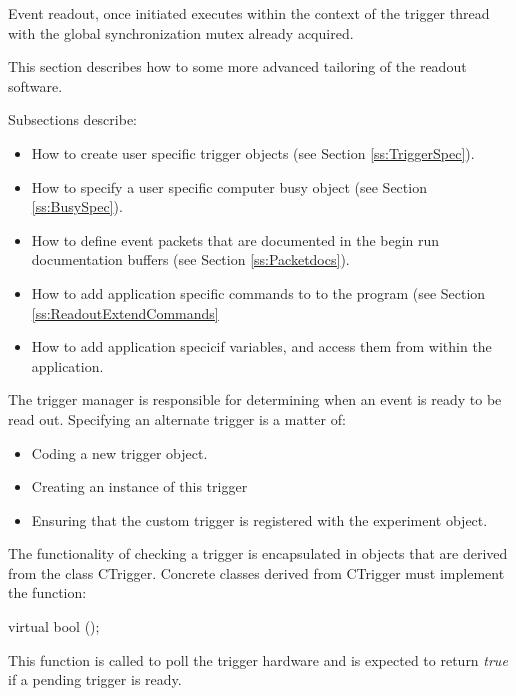    Event readout, once initiated executes within the context of the 
   trigger thread with the global synchronization mutex already acquired.
   

   This section describes how to some more advanced tailoring of
   the readout software.   
   
   \begin{iftex}            %
   Subsections describe:
      \begin{itemize}
	 \item How to create user specific trigger objects
	    (see Section \ref{ss:TriggerSpec}).
	 \item How to specify a user specific computer busy
	     object (see Section \ref{ss:BusySpec}).
	 \item How to define event packets that are documented
	     in the begin run documentation buffers
	       (see Section \ref{ss:Packetdocs}).
	 \item How to add application specific commands to to
	    the program (see Section \ref{ss:ReadoutExtendCommands}
	 \item How to add application specicif variables, and
	    access them from within the application.
      \end{itemize}
   \end{iftex}

      The trigger manager is responsible for determining
      when an event is ready to be read out.
      Specifying an alternate trigger is a matter of:
      \begin{itemize}
	 \item Coding a new trigger object.
	 \item Creating an instance of this trigger
	 \item Ensuring that the custom trigger is
	    registered with the experiment object.
      \end{itemize}
   
      The functionality of checking a trigger is encapsulated in
      objects that are derived from the class CTrigger.
      Concrete classes derived from CTrigger must implement the
      function:
      \begin{example}
	 virtual bool ();
      \end{example}
      This function is called to poll the trigger hardware
      and is expected to return {\em true} if a pending trigger
      is ready.
   
